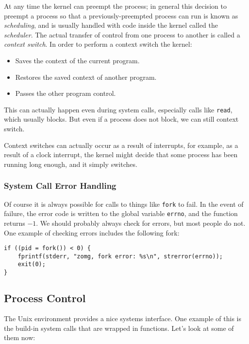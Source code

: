 \documentclass[fleqn]{article}
\begin{document}
At any time the kernel can preempt the process; in general this decision to preempt a process so that a previously-preempted process can run is known as \textit{scheduling}, and is usually handled with code inside the kernel called the \textit{scheduler}. The actual transfer of control from one process to another is called a \textit{context switch}. In order to perform a context switch the kernel:

\begin{itemize}
\item Saves the context of the current program.
\item Restores the saved context of another program.
\item Passes the other program control.
\end{itemize}

This can actually happen even during system calls, especially calls like \texttt{read}, which usually blocks. But even if a process does not block, we can still context switch.

Context switches can actually occur as a result of interrupts, for example, as a result of a clock interrupt, the kernel might decide that some process has been running long enough, and it simply switches.

\subsubsection{System Call Error Handling}

Of course it is always possible for calls to things like  \texttt{fork} to fail. In the event of failure, the error code is written to the global variable \texttt{errno}, and the function returns $-1$. We should probably always check for errors, but most people do not. One example of checking errors includes the following fork:

\begin{verbatim}
if ((pid = fork()) < 0) {
    fprintf(stderr, "zomg, fork error: %s\n", strerror(errno));
    exit(0);
}
\end{verbatim}

\subsection{Process Control}

The Unix environment provides a nice systems interface. One example of this is the build-in system calls that are wrapped in functions. Let's look at some of them now:
\end{document}
